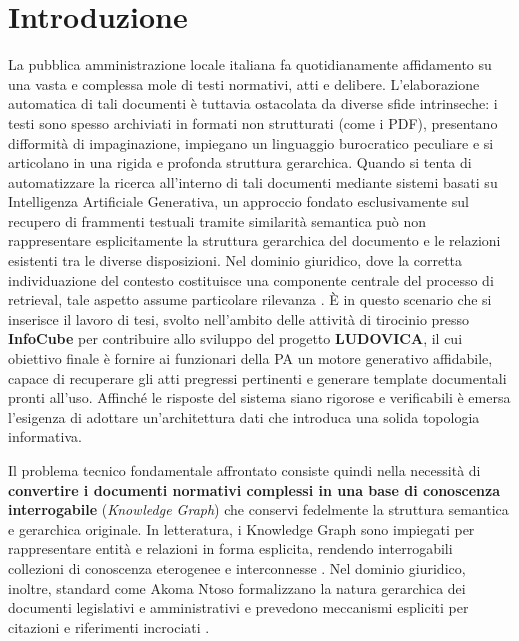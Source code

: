 \chapter{Introduzione}\label{chap:first}

\inlineminitoc

La pubblica amministrazione locale italiana fa quotidianamente affidamento su una vasta e complessa mole di testi normativi, atti e delibere. L'elaborazione automatica di tali documenti è tuttavia ostacolata da diverse sfide intrinseche: i testi sono spesso archiviati in formati non strutturati (come i PDF), presentano difformità di impaginazione, impiegano un linguaggio burocratico peculiare e si articolano in una rigida e profonda struttura gerarchica. 
Quando si tenta di automatizzare la ricerca all'interno di tali documenti mediante sistemi basati su Intelligenza Artificiale Generativa, un approccio fondato esclusivamente sul recupero di frammenti testuali tramite similarità semantica può non rappresentare esplicitamente la struttura gerarchica del documento e le relazioni esistenti tra le diverse disposizioni. Nel dominio giuridico, dove la corretta individuazione del contesto costituisce una componente centrale del processo di retrieval, tale aspetto assume particolare rilevanza \cite{pipitone2024legalbenchrag}.
È in questo scenario che si inserisce il lavoro di tesi, svolto nell'ambito delle attività di tirocinio presso \textbf{InfoCube} per contribuire allo sviluppo del progetto \textbf{LUDOVICA}, il cui obiettivo finale è fornire ai funzionari della PA un motore generativo affidabile, capace di recuperare gli atti pregressi pertinenti e generare template documentali pronti all'uso. Affinché le risposte del sistema siano rigorose e verificabili è emersa l'esigenza di adottare un'architettura dati che introduca una solida topologia informativa.

Il problema tecnico fondamentale affrontato consiste quindi nella necessità di \textbf{convertire i documenti normativi complessi in una base di conoscenza interrogabile} (\textit{Knowledge Graph}) che conservi fedelmente la struttura semantica e gerarchica originale. In letteratura, i Knowledge Graph sono impiegati per rappresentare entità e relazioni in forma esplicita, rendendo interrogabili collezioni di conoscenza eterogenee e interconnesse \cite{hogan2021knowledgegraphs}. Nel dominio giuridico, inoltre, standard come Akoma Ntoso formalizzano la natura gerarchica dei documenti legislativi e amministrativi e prevedono meccanismi espliciti per citazioni e riferimenti incrociati \cite{akoma_ntoso_2018}.

